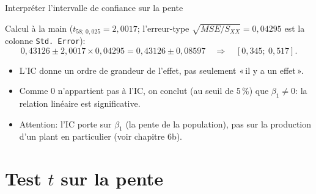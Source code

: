 \documentclass{BeamerTemplate}
\begin{document}
\begin{frame}[t]{Interpréter l'intervalle de confiance sur la pente}

\small
Calcul à la main ($t_{58;\,0{,}025}=2{,}0017$; l'erreur-type
$\sqrt{MSE/S_{XX}}=0{,}04295$ est la colonne \texttt{Std.\ Error}):
\[
0{,}43126\pm2{,}0017\times0{,}04295=0{,}43126\pm0{,}08597
\quad\Rightarrow\quad[0{,}345;\ 0{,}517].
\]

\normalsize
{}

\begin{itemize}\itemsep2mm
  \item<3-> L'IC donne un ordre de grandeur de l'effet, pas seulement «\,il y a un
  effet\,».
  \item<3-> Comme 0 n'appartient pas à l'IC, on conclut (au seuil de 5\,\%) que
  $\beta_1\ne0$: la relation linéaire est significative.
  \item<3-> Attention: l'IC porte sur $\beta_1$ (la pente de la population), pas sur
  la production d'un plant en particulier (voir chapitre 6b).
\end{itemize}

\end{frame}

\section{Test $t$ sur la pente}
\end{document}
